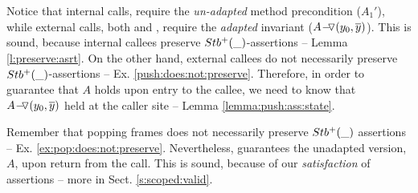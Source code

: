 Notice that %
  internal calls, {}   require   the \emph{un-adapted} %
 method  precondition (\ie $A_1'$), while   external calls, both {} and {},  require the 
 \emph{adapted} %
 invariant (\ie $ \PushASLong {(y_0, \overline y)}{A}$). 
{This is sound, because  internal callees preserve  %
 $\Pos{\_}$-assertions} %
 -- \cf Lemma \ref{l:preserve:asrt}. 
On the other hand, %
 {external callees do not necessarily preserve  $\Pos{\_}$-assertions} -- \cf Ex. \ref{push:does:not:preserve}. 
Therefore, in order to guarantee that $A$ holds upon entry to the callee, we need to know that $ \PushASLong {(y_0, \overline y)}{A}$ held at the caller site -- \cf Lemma \ref{lemma:push:ass:state}.



Remember that {popping frames does not necessarily preserve}
 $\Pos{\_}$  assertions %
-- \cf Ex. \ref{ex:pop:does:not:preserve}.
Nevertheless, {} guarantees the unadapted version, $A$,  upon return from the call. 
This is sound, because of our %
 \emph{\strong satisfaction} of assertions -- more in Sect.  \ref{s:scoped:valid}.
 

